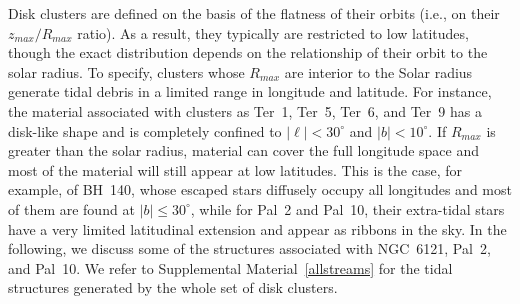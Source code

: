             Disk clusters are defined on the basis of the flatness of their orbits (i.e., on their $z_{max}/R_{max}$ ratio). As a result, they typically are restricted to low latitudes, though the exact distribution depends on the relationship of their orbit to the solar radius. To specify, clusters whose $R_{max}$ are interior to the Solar radius generate tidal debris in a limited range in longitude and latitude. For instance, the material associated with clusters as Ter~1, Ter~5, Ter~6, and Ter~9 has a disk-like shape and is completely confined to $|\ell| <30^{\circ}$ and $|b|<10^{\circ}$. If $R_{max}$ is greater than the solar radius, material can cover the full longitude space and most of the material will still appear at low latitudes. This is the case, for example, of BH~140, whose escaped stars diffusely occupy all longitudes and most of them are found at $|b| \le 30^\circ$, while for Pal~2 and Pal~10, their extra-tidal stars have a very limited latitudinal extension and appear as ribbons in the sky. In the following, we discuss some of the structures associated with NGC~6121, Pal~2, and Pal~10. We refer to Supplemental Material~\ref{allstreams} for the tidal structures generated by the whole set of disk clusters.  


